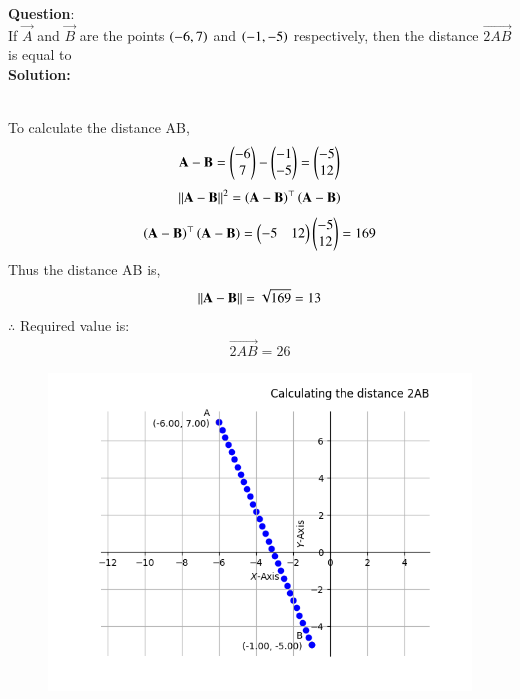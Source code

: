 \documentclass[journal]{IEEEtran}
\begin{document}
\textbf{Question}:\\
If $\vec{A}$ and $\vec{B}$ are the points $\left(-6, 7\right)$ and $\left(-1, -5\right)$ respectively, then the distance $\vec{2AB}$ is
equal to
\\ \textbf{Solution: }\\
    \begin{table}[h!]    
      \centering
      
      \caption{}
    \end{table}\\
    To calculate the distance AB,
    \begin{align}
        \mathbf{A}-\mathbf{B} = \begin{pmatrix}-6 \\ 7\end{pmatrix} - \begin{pmatrix}-1 \\ -5\end{pmatrix} = \begin{pmatrix}-5 \\ 12\end{pmatrix}\label{eq1.1.9.28.1}
    \end{align}
    \begin{align}
    	\left\vert\left\vert\mathbf{A}-\mathbf{B}\right\vert\right\vert^2 = \left(\mathbf{A}-\mathbf{B}\right)^\top \left(\mathbf{A}-\mathbf{B}\right)\label{eq1.1.9.28.2}
    \end{align}
    \begin{align}
		 \left(\mathbf{A}-\mathbf{B}\right)^\top \left(\mathbf{A}-\mathbf{B}\right) = \begin{pmatrix}-5 & 12\end{pmatrix}\begin{pmatrix}-5 \\ 12\end{pmatrix} = 169\label{eq1.1.9.28.3}
	\end{align}
	Thus the distance AB is,
    \begin{align}
	\left\vert\left\vert\mathbf{A}-\mathbf{B}\right\vert\right\vert = \sqrt{169}= 13 \label{eq1.1.9.28.4}
	\end{align}
	$\therefore$ Required value is:
	\begin{align}
		\vec{2AB} = 26
	\end{align}
    \begin{figure}[h]
        \centering
       \includegraphics[width=0.7\linewidth]{figs/fig1.png}
       \caption{}
       \label{graph}
    \end{figure}
\end{document}
